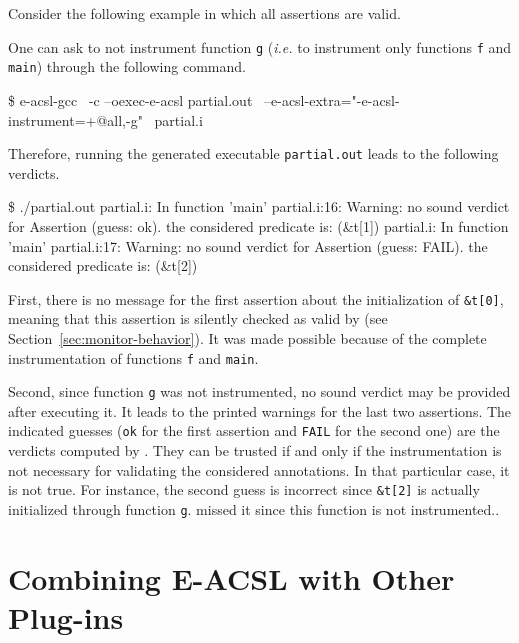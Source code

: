 Consider the following example in which all assertions are valid.


One can ask to not instrument function \texttt{g} (\emph{i.e.} to instrument
only functions \texttt{f} and \texttt{main}) through the following command.
\begin{logs}
\$ e-acsl-gcc \
  -c --oexec-e-acsl partial.out \
  --e-acsl-extra="-e-acsl-instrument=+@all,-g" \
  partial.i
\end{logs}

Therefore, running the generated executable \texttt{partial.out} leads to the
following verdicts.
\begin{logs}
\$ ./partial.out
partial.i: In function 'main'
partial.i:16: Warning: no sound verdict for Assertion (guess: ok).
        the considered predicate is:
        \initialized(&t[1])
partial.i: In function 'main'
partial.i:17: Warning: no sound verdict for Assertion (guess: FAIL).
        the considered predicate is:
        \initialized(&t[2])
\end{logs}

First, there is no message for the first assertion about the initialization of
\texttt{\&t[0]}, meaning that this assertion is silently checked as valid by
\eacsl (see Section~\ref{sec:monitor-behavior}). It was made possible because of
the complete instrumentation of functions \texttt{f} and \texttt{main}.

Second, since function \texttt{g} was not instrumented, no sound verdict may be
provided after executing it. It leads to the printed warnings for the last two
assertions. The indicated guesses (\texttt{ok} for the first assertion and
\texttt{FAIL} for the second one) are the verdicts computed by \eacsl. They can
be trusted if and only if the \eacsl instrumentation is not necessary for
validating the considered annotations. In that particular case, it is not
true. For instance, the second guess is incorrect since \texttt{\&t[2]} is
actually initialized through function \texttt{g}. \eacsl missed it since this
function is not instrumented..

\section{Combining E-ACSL with Other Plug-ins} %
\label{sec:combine}

